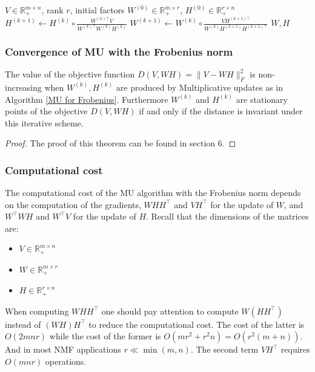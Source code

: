 \begin{algorithm}
    \caption{Multiplicative Updates for NMF with the Frobenius norm}
    \label{MU for Frobenius}
    \begin{algorithmic}[1]
        \Require \( V \in \mathbb{R}_+^{m \times n} \), rank \( r \), initial factors \( W^{(0)} \in \mathbb{R}_+^{m \times r} \), \( H^{(0)} \in \mathbb{R}_+^{r \times n} \)
            \State \( H^{(k+1)} \leftarrow H^{(k)} \circ \frac{W^{(k) \top} V}{W^{(k) \top} W^{(k)} H^{(k)}} \)
            \State \( W^{(k+1)} \leftarrow W^{(k)} \circ \frac{V H^{(k+1) \top}}{W^{(k)} H^{(k+1)} H^{(k+1) \top}} \)
        \EndWhile
        \State \Return \( W, H \)
    \end{algorithmic}
\end{algorithm}
\subsubsection{Convergence of MU with the Frobenius norm}
\begin{theorem} \label{MU convergence Fro}
    The value of the objective function $D(V, WH) = \|V - WH \|_F^2$ is non-increasing when $W^{(k)}, H^{(k)}$ are produced by Multiplicative updates as in Algorithm \ref{MU for Frobenius}.
    Furthermore $W^{(k)}$ and $H^{(k)}$ are stationary points of the objective $D(V, WH)$ if and only if the distance is invariant under this iterative scheme.
\end{theorem}
\begin{proof}
    The proof of this theorem can be found in \cite{lee2000algorithms} section 6.
\end{proof}
\subsubsection{Computational cost}
The computational cost of the MU algorithm with the Frobenius norm depends on the computation of the gradients, $WHH^\top$ and $VH^\top$ for the update of $W$,
and $W^\top WH$ and $W^\top V$ for the update of $H$.
Recall that the dimensions of the matrices are:
\begin{itemize}
    \item \( V \in \mathbb{R}_+^{m \times n} \)
    \item \( W \in \mathbb{R}_+^{m \times r} \)
    \item \( H \in \mathbb{R}_+^{r \times n} \)
\end{itemize}
When computing $WHH^\top$ one should pay attention to compute $W(HH^\top)$ instead of $(WH)H^\top$ to reduce the computational cost.
The cost of the latter is $O(2mnr)$ while the cost of the former is $O(mr^2 + r^2 n) = O(r^2(m+n))$. And in most NMF applications $r \ll \min(m,n)$.
The second term $VH^\top$ requires $O(mnr)$ operations.
